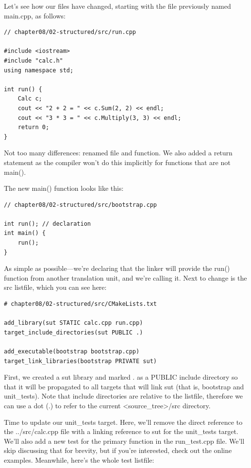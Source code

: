 Let's see how our files have changed, starting with the file previously named main.cpp, as follows:

\begin{lstlisting}[style=styleCXX]
// chapter08/02-structured/src/run.cpp

#include <iostream>
#include "calc.h"
using namespace std;

int run() {
	Calc c;
	cout << "2 + 2 = " << c.Sum(2, 2) << endl;
	cout << "3 * 3 = " << c.Multiply(3, 3) << endl;
	return 0;
}
\end{lstlisting} 

Not too many differences: renamed file and function. We also added a return statement as the compiler won't do this implicitly for functions that are not main().

The new main() function looks like this:

\begin{lstlisting}[style=styleCXX]
// chapter08/02-structured/src/bootstrap.cpp

int run(); // declaration
int main() {
	run();
}
\end{lstlisting} 

As simple as possible—we're declaring that the linker will provide the run() function from another translation unit, and we're calling it. Next to change is the src listfile, which you can see here:

\begin{lstlisting}[style=styleCMake]
# chapter08/02-structured/src/CMakeLists.txt

add_library(sut STATIC calc.cpp run.cpp)
target_include_directories(sut PUBLIC .)

add_executable(bootstrap bootstrap.cpp)
target_link_libraries(bootstrap PRIVATE sut)
\end{lstlisting} 

First, we created a sut library and marked . as a PUBLIC include directory so that it will be propagated to all targets that will link sut (that is, bootstrap and unit\_tests). Note that include directories are relative to the listfile, therefore we can use a dot (.) to refer to the current <source\_tree>/src directory.

Time to update our unit\_tests target. Here, we'll remove the direct reference to the ../src/calc.cpp file with a linking reference to sut for the unit\_tests target. We'll also add a new test for the primary function in the run\_test.cpp file. We'll skip discussing that for brevity, but if you're interested, check out the online examples. Meanwhile, here's the whole test listfile:

